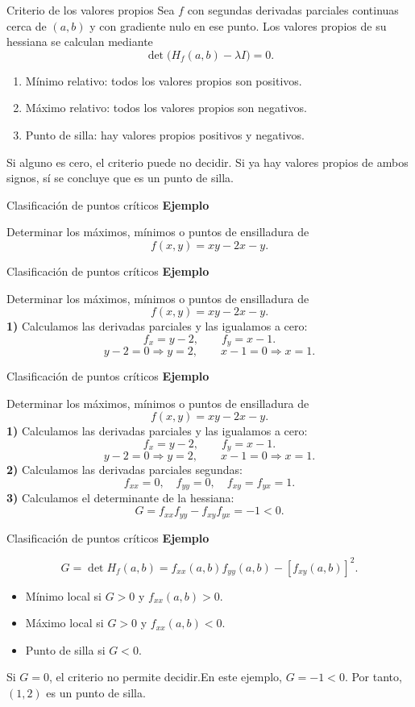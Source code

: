 \documentclass[original_version/main.tex]{subfiles}
\begin{document}
\begin{frame}{Criterio de los valores propios}
\small Sea $f$ con segundas derivadas parciales continuas cerca de $(a,b)$ y con gradiente nulo en ese punto. Los valores propios de su hessiana se calculan mediante
\[\det\bigl(H_f(a,b)-\lambda I\bigr)=0.\]
\begin{enumerate}
\item Mínimo relativo: todos los valores propios son positivos.
\item Máximo relativo: todos los valores propios son negativos.
\item Punto de silla: hay valores propios positivos y negativos.
\end{enumerate}
Si alguno es cero, el criterio puede no decidir. Si ya hay valores propios de ambos signos, sí se concluye que es un punto de silla.
\end{frame}
\begin{frame}{Clasificación de puntos críticos}
\textbf{Ejemplo}\par Determinar los máximos, mínimos o puntos de ensilladura de\[f(x,y)=xy-2x-y.\]
\end{frame}
\begin{frame}{Clasificación de puntos críticos}
\textbf{Ejemplo}\par Determinar los máximos, mínimos o puntos de ensilladura de\[f(x,y)=xy-2x-y.\]\textbf{1)} Calculamos las derivadas parciales y las igualamos a cero:
\[f_x=y-2,\qquad f_y=x-1.\]
\[y-2=0\Rightarrow y=2,\qquad x-1=0\Rightarrow x=1.\]
\end{frame}
\begin{frame}{Clasificación de puntos críticos}
\small\textbf{Ejemplo}\par Determinar los máximos, mínimos o puntos de ensilladura de\[f(x,y)=xy-2x-y.\]\textbf{1)} Calculamos las derivadas parciales y las igualamos a cero:
\[f_x=y-2,\qquad f_y=x-1.\]
\[y-2=0\Rightarrow y=2,\qquad x-1=0\Rightarrow x=1.\]\textbf{2)} Calculamos las derivadas parciales segundas:
\[f_{xx}=0,\quad f_{yy}=0,\quad f_{xy}=f_{yx}=1.\]
\textbf{3)} Calculamos el determinante de la hessiana:
\[G=f_{xx}f_{yy}-f_{xy}f_{yx}=-1<0.\]
\end{frame}
\begin{frame}{Clasificación de puntos críticos}
\small\textbf{Ejemplo}\par\[G=\det H_f(a,b)=f_{xx}(a,b)f_{yy}(a,b)-[f_{xy}(a,b)]^2.\]
\begin{itemize}
\item Mínimo local si $G>0$ y $f_{xx}(a,b)>0$.
\item Máximo local si $G>0$ y $f_{xx}(a,b)<0$.
\item Punto de silla si $G<0$.
\end{itemize}
Si $G=0$, el criterio no permite decidir.\medskip En este ejemplo, $G=-1<0$. Por tanto, $(1,2)$ es un punto de silla.
\end{frame}
\end{document}
